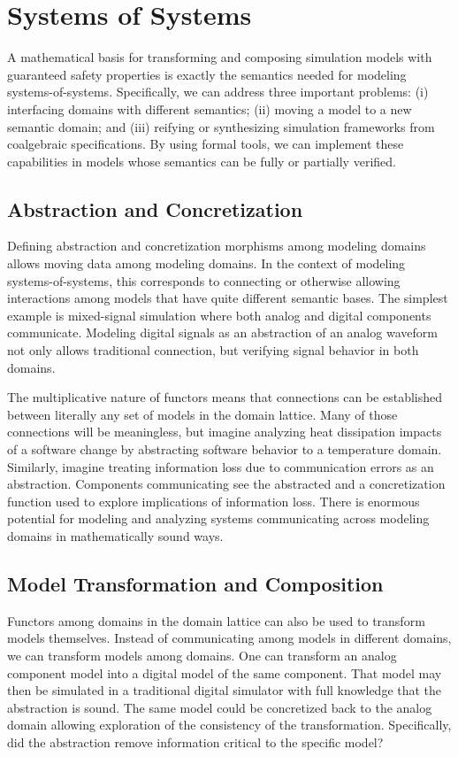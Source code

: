 \documentclass[12pt]{article}
\begin{document}
\section{Systems of Systems}

A mathematical basis for transforming and composing simulation models
with guaranteed safety properties is exactly the semantics needed for
modeling systems-of-systems.  Specifically, we can address three
important problems: (i) interfacing domains with different semantics;
(ii) moving a model to a new semantic domain; and (iii) reifying or
synthesizing simulation frameworks from coalgebraic specifications.
By using formal tools, we can implement these capabilities in models
whose semantics can be fully or partially verified.

\subsection{Abstraction and Concretization}

Defining abstraction and concretization morphisms among modeling
domains allows moving data among modeling domains.  In the context of
modeling systems-of-systems, this corresponds to connecting or
otherwise allowing interactions among models that have quite different
semantic bases.  The simplest example is mixed-signal simulation where
both analog and digital components communicate.  Modeling digital
signals as an abstraction of an analog waveform not only allows
traditional connection, but verifying signal behavior in both domains.

The multiplicative nature of functors means that connections can be
established between literally any set of models in the domain
lattice.  Many of those connections will be meaningless, but imagine
analyzing heat dissipation impacts of a software change by abstracting
software behavior to a temperature domain.  Similarly, imagine
treating information loss due to communication errors as an
abstraction.  Components communicating see the abstracted and a
concretization function used to explore implications of information
loss.  There is enormous potential for modeling and analyzing systems
communicating across modeling domains in mathematically sound ways.

\subsection{Model Transformation and Composition}

Functors among domains in the domain lattice can also be used to
transform models themselves.  Instead of communicating among models in
different domains, we can transform models among domains.  One can
transform an analog component model into a digital model of the same
component.  That model may then be simulated in a traditional digital
simulator with full knowledge that the abstraction is sound.  The same
model could be concretized back to the analog domain allowing
exploration of the consistency of the transformation.  Specifically,
did the abstraction remove information critical to the specific model?
\end{document}
